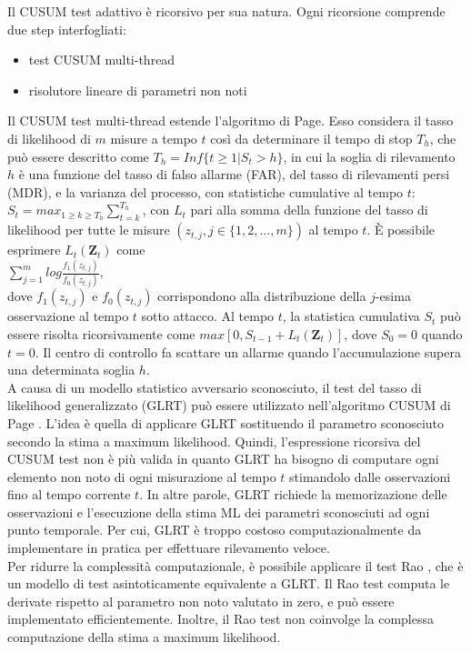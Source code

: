 Il CUSUM test adattivo è ricorsivo per sua natura. Ogni ricorsione comprende due step interfogliati:
\begin{itemize}
	\item test CUSUM multi-thread
	\item risolutore lineare di parametri non noti
\end{itemize}
Il CUSUM test multi-thread estende l'algoritmo di Page. Esso considera il tasso di likelihood di $m$ misure a tempo $t$ così da determinare il tempo di stop $T_h$, che può essere descritto come $T_h = Inf\lbrace t \geq 1 | S_t > h \rbrace$, in cui la soglia di rilevamento $h$ è una funzione del tasso di falso allarme (FAR), del tasso di rilevamenti persi (MDR), e la varianza del processo, con statistiche cumulative al tempo $t$: $S_t = max_{1\geq k \geq T_h}\sum_{t=k}^{T_h}$, con $L_t$ pari alla somma della funzione del tasso di likelihood per tutte le misure $(z_{t,j}, j \in \lbrace1, 2, \ldots, m\rbrace)$ al tempo $t$. È possibile esprimere $L_t(\textbf{Z}_t)$ come\\
\indent $\sum_{j=1}^{m}log\frac{f_1(z_{t,j})}{f_0(z_{t,j})}$,\\
dove $f_1(z_{t,j})$ e $f_0(z_{t,j})$ corrispondono alla distribuzione della $j$-esima osservazione al tempo $t$ sotto attacco. Al tempo $t$, la statistica cumulativa $S_t$ può essere risolta ricorsivamente come $max[0, S_{t-1} + L_t(\textbf{Z}_t)]$, dove $S_0 = 0$ quando $t = 0$. Il centro di controllo fa scattare un allarme quando l'accumulazione supera una determinata soglia $h$.\\
A causa di un modello statistico avversario sconosciuto, il test del tasso di likelihood generalizzato (GLRT) può essere utilizzato nell'algoritmo CUSUM di Page \cite{lorden}. L'idea è quella di applicare GLRT sostituendo il parametro sconosciuto secondo la stima a maximum likelihood. Quindi, l'espressione ricorsiva del CUSUM test non è più valida in quanto GLRT ha bisogno di computare ogni elemento non noto di ogni misurazione al tempo $t$ stimandolo dalle osservazioni fino al tempo corrente $t$. In altre parole, GLRT richiede la memorizazione delle osservazioni e l'esecuzione della stima ML dei parametri sconosciuti ad ogni punto temporale. Per cui, GLRT è troppo costoso computazionalmente da implementare in pratica per effettuare rilevamento veloce.\\
Per ridurre la complessità computazionale, è possibile applicare il test Rao \cite{lorden}, che è un modello di test asintoticamente equivalente a GLRT. Il Rao test computa le derivate rispetto al parametro non noto valutato in zero, e può essere implementato efficientemente. Inoltre, il Rao test non coinvolge la complessa computazione della stima a maximum likelihood.\\
